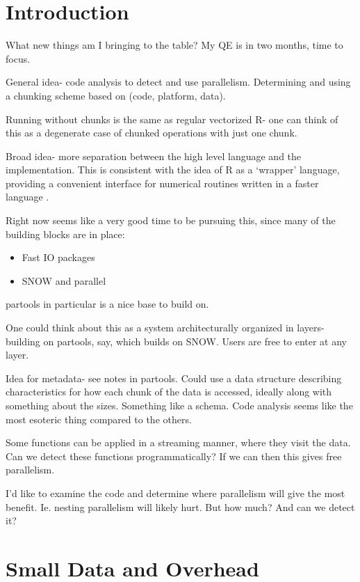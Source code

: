 \documentclass[12pt]{article}
\begin{document}
\section{Introduction}

What new things am I bringing to the table? My QE is in two months, time to
focus.

General idea- code analysis to detect and use parallelism. Determining and
using a chunking scheme based on (code, platform, data).

Running without chunks is the same as regular vectorized R- one can think
of this as a degenerate case of chunked operations with just one chunk.

Broad idea- more separation between the high level language
and the implementation. This is consistent with the idea of R as a `wrapper'
language, providing a convenient interface for numerical routines written
in a faster language \cite{chambers2016extending}.

Right now seems like a very good time to be pursuing this, since many of the
building blocks are in place:
\begin{itemize}
    \item Fast IO packages
    \item SNOW and parallel
\end{itemize}

partools in particular is a nice base to build on.

One could think about this as a system architecturally organized in layers- building on
partools, say, which builds on SNOW. Users are free to enter at any layer.

Idea for metadata- see notes in partools. Could use a data structure
describing characteristics for how each chunk of the data is accessed,
ideally along with something about the sizes. Something like a schema.
Code analysis seems like the most esoteric thing compared to the others.

Some functions can be applied in a streaming manner, where they visit the
data. Can we detect these functions programmatically? If we can then this
gives free parallelism.

I'd like to examine the code and determine where parallelism will give the
most benefit. Ie. nesting parallelism will likely hurt. But how much? And
can we detect it?

\section{Small Data and Overhead}
\end{document}
